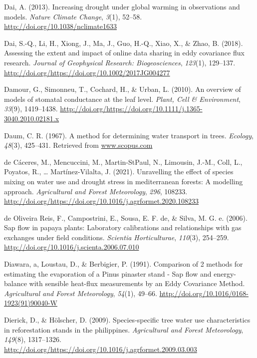 \documentclass[11pt,twoside]{reedthesis}
\begin{document}
\hypertarget{ref-Dai2013}{}
Dai, A. (2013). Increasing drought under global warming in observations
and models. \emph{Nature Climate Change}, \emph{3}(1), 52--58.
\url{http://doi.org/10.1038/nclimate1633}

\hypertarget{ref-Dai2018}{}
Dai, S.-Q., Li, H., Xiong, J., Ma, J., Guo, H.-Q., Xiao, X., \& Zhao, B.
(2018). Assessing the extent and impact of online data sharing in eddy
covariance flux research. \emph{Journal of Geophysical Research:
Biogeosciences}, \emph{123}(1), 129--137.
\url{http://doi.org/https://doi.org/10.1002/2017JG004277}

\hypertarget{ref-Damour2010}{}
Damour, G., Simonneu, T., Cochard, H., \& Urban, L. (2010). An overview
of models of stomatal conductance at the leaf level. \emph{Plant, Cell
\& Environment}, \emph{33}(9), 1419--1438.
\url{http://doi.org/https://doi.org/10.1111/j.1365-3040.2010.02181.x}

\hypertarget{ref-Daum1967}{}
Daum, C. R. (1967). A method for determining water transport in trees.
\emph{Ecology}, \emph{48}(3), 425--431. Retrieved from
\url{www.scopus.com}

\hypertarget{ref-decaceres2021}{}
de Cáceres, M., Mencuccini, M., Martin-StPaul, N., Limousin, J.-M.,
Coll, L., Poyatos, R., \ldots{} Martínez-Vilalta, J. (2021). Unravelling
the effect of species mixing on water use and drought stress in
mediterranean forests: A modelling approach. \emph{Agricultural and
Forest Meteorology}, \emph{296}, 108233.
\url{http://doi.org/https://doi.org/10.1016/j.agrformet.2020.108233}

\hypertarget{ref-DeOliveiraReis2006}{}
de Oliveira Reis, F., Campostrini, E., Sousa, E. F. de, \& Silva, M. G.
e. (2006). Sap flow in papaya plants: Laboratory calibrations and
relationships with gas exchanges under field conditions. \emph{Scientia
Horticulturae}, \emph{110}(3), 254--259.
\url{http://doi.org/10.1016/j.scienta.2006.07.010}

\hypertarget{ref-Diawara1991}{}
Diawara, a, Loustau, D., \& Berbigier, P. (1991). Comparison of 2
methods for estimating the evaporation of a Pinus pinaster stand - Sap
flow and energy-balance with sensible heat-flux measurements by an Eddy
Covariance Method. \emph{Agricultural and Forest Meteorology},
\emph{54}(1), 49--66. \url{http://doi.org/10.1016/0168-1923(91)90040-W}

\hypertarget{ref-Dierick2009}{}
Dierick, D., \& Hölscher, D. (2009). Species-specific tree water use
characteristics in reforestation stands in the philippines.
\emph{Agricultural and Forest Meteorology}, \emph{149}(8), 1317--1326.
\url{http://doi.org/https://doi.org/10.1016/j.agrformet.2009.03.003}
\end{document}
